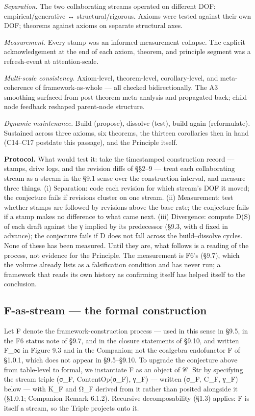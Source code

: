 \documentclass[11pt, openany]{book}
\begin{document}
\textit{Separation.} The two collaborating streams operated on different DOF: empirical/generative ↔ structural/rigorous. Axioms were tested against their own DOF; theorems against axioms on separate structural axes.

\textit{Measurement.} Every stamp was an informed-measurement collapse. The explicit acknowledgement at the end of each axiom, theorem, and principle segment was a refresh-event at attention-scale.

\textit{Multi-scale consistency.} Axiom-level, theorem-level, corollary-level, and meta-coherence of framework-as-whole --- all checked bidirectionally. The A3 smoothing surfaced from post-theorem meta-analysis and propagated back; child-node feedback reshaped parent-node structure.

\textit{Dynamic maintenance.} Build (propose), dissolve (test), build again (reformulate). Sustained across three axioms, six theorems, the thirteen corollaries then in hand (C14–C17 postdate this passage), and the Principle itself.

\textbf{Protocol.} What would test it: take the timestamped construction record --- stamps, drive logs, and the revision diffs of §§2–9 --- treat each collaborating stream as a stream in the §9.1 sense over the construction interval, and measure three things. (i) Separation: code each revision for which stream's DOF it moved; the conjecture fails if revisions cluster on one stream. (ii) Measurement: test whether stamps are followed by revisions above the base rate; the conjecture fails if a stamp makes no difference to what came next. (iii) Divergence: compute D(S) of each draft against the γ implied by its predecessor (§9.3, with d fixed in advance); the conjecture fails if D does not fall across the build–dissolve cycles. None of these has been measured. Until they are, what follows is a reading of the process, not evidence for the Principle. The measurement is F6's (§9.7), which the volume already lists as a falsification condition and has never run; a framework that reads its own history as confirming itself has helped itself to the conclusion.

\subsection{F-as-stream --- the formal construction}

Let F denote the framework-construction process --- used in this sense in §9.5, in the F6 status note of §9.7, and in the closure statements of §9.10, and written F\_\allowbreak{}∞ in Figure 9.3 and in the Companion; not the coalgebra endofunctor F of §1.0.1, which does not appear in §9.5–§9.10. To upgrade the conjecture above from table-level to formal, we instantiate F as an object of 𝒞\_\allowbreak{}Str by specifying the stream triple (σ\_\allowbreak{}F, ContentOp(σ\_\allowbreak{}F), γ\_\allowbreak{}F) --- written (σ\_\allowbreak{}F, C\_\allowbreak{}F, γ\_\allowbreak{}F) below --- with K\_\allowbreak{}F and Ω\_\allowbreak{}F derived from it rather than posited alongside it (§1.0.1; Companion Remark 6.1.2). Recursive decomposability (§1.3) applies: F is itself a stream, so the Triple projects onto it.
\end{document}
